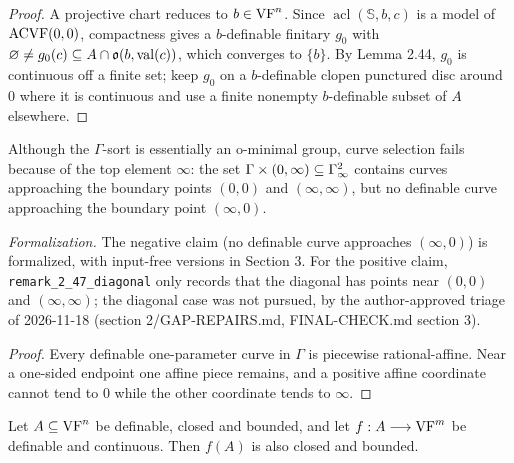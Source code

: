 \begin{proof}
\leanok
A projective chart reduces to $b \in \mathrm{VF}^n$. Since $\operatorname{acl}(\mathbb{S}, b, c)$ is a model of $\mathrm{ACVF}(0,0)$, compactness gives a $b$-definable finitary $g_0$ with $\varnothing \ne g_0(c) \subseteq A \cap \mathfrak{o}(b, \operatorname{val}(c))$, which converges to $\{b\}$. By Lemma 2.44, $g_0$ is continuous off a finite set; keep $g_0$ on a $b$-definable clopen punctured disc around $0$ where it is continuous and use a finite nonempty $b$-definable subset of $A$ elsewhere.
\end{proof}

\setcounter{theorem}{46}
\begin{remark}
\label{s2-gamma-curve-selection-fails}
\leanok
{}
Although the $\Gamma$-sort is essentially an o-minimal group, curve selection fails because of the top element $\infty$: the set $\Gamma \times (0, \infty) \subseteq \Gamma_\infty^2$ contains curves approaching the boundary points $(0,0)$ and $(\infty,\infty)$, but no definable curve approaching the boundary point $(\infty, 0)$.

\emph{Formalization.} The negative claim (no definable curve approaches $(\infty,0)$) is formalized, with input-free versions in Section 3. For the positive claim, \texttt{remark\_2\_47\_diagonal} only records that the diagonal has points near $(0,0)$ and $(\infty,\infty)$; the diagonal case was not pursued, by the author-approved triage of 2026-11-18 (section 2/GAP-REPAIRS.md, FINAL-CHECK.md section 3).
\end{remark}

\begin{proof}
Every definable one-parameter curve in $\Gamma$ is piecewise rational-affine. Near a one-sided endpoint one affine piece remains, and a positive affine coordinate cannot tend to $0$ while the other coordinate tends to $\infty$.
\end{proof}

\setcounter{theorem}{47}
\begin{lemma}
\label{cb-to-cb}
\leanok
Let $A \subseteq \mathrm{VF}^n$ be definable, closed and bounded, and let $f : A \longrightarrow \mathrm{VF}^m$ be definable and continuous. Then $f(A)$ is also closed and bounded.
\end{lemma}

